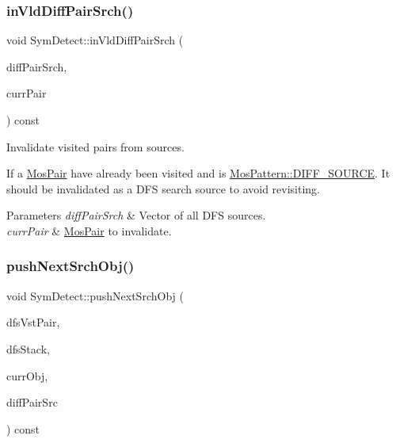 \subsubsection{\texorpdfstring{in\+Vld\+Diff\+Pair\+Srch()}{inVldDiffPairSrch()}}
{\footnotesize\ttfamily void Sym\+Detect\+::in\+Vld\+Diff\+Pair\+Srch (\begin{DoxyParamCaption}\item[{std\+::vector$<$ \hyperlink{structMosPair}{Mos\+Pair} $>$ \&}]{diff\+Pair\+Srch,  }\item[{\hyperlink{structMosPair}{Mos\+Pair} \&}]{curr\+Pair }\end{DoxyParamCaption}) const\hspace{0.3cm}{\ttfamily [private]}}



Invalidate visited pairs from sources. 

If a \hyperlink{structMosPair}{Mos\+Pair} have already been visited and is \hyperlink{type_8h_af19eddb079bfea723256710b029c38e8ad45b64a7d6b85dde1b52dd5a18863933}{Mos\+Pattern\+::\+D\+I\+F\+F\+\_\+\+S\+O\+U\+R\+CE}. It should be invalidated as a D\+FS search source to avoid revisiting.


\begin{DoxyParams}{Parameters}
{\em diff\+Pair\+Srch} & Vector of all D\+FS sources. \\
\hline
{\em curr\+Pair} & \hyperlink{structMosPair}{Mos\+Pair} to invalidate. \\
\hline
\end{DoxyParams}
\mbox{\label{classSymDetect_a9bdb845d015762b59f3dc977a76aed32}} 
\subsubsection{\texorpdfstring{push\+Next\+Srch\+Obj()}{pushNextSrchObj()}}
{\footnotesize\ttfamily void Sym\+Detect\+::push\+Next\+Srch\+Obj (\begin{DoxyParamCaption}\item[{std\+::vector$<$ \hyperlink{structMosPair}{Mos\+Pair} $>$ \&}]{dfs\+Vst\+Pair,  }\item[{std\+::vector$<$ \hyperlink{structSymDetect_1_1srchObj}{srch\+Obj} $>$ \&}]{dfs\+Stack,  }\item[{\hyperlink{structSymDetect_1_1srchObj}{srch\+Obj} \&}]{curr\+Obj,  }\item[{std\+::vector$<$ \hyperlink{structMosPair}{Mos\+Pair} $>$ \&}]{diff\+Pair\+Src }\end{DoxyParamCaption}) const\hspace{0.3cm}{\ttfamily [private]}}



